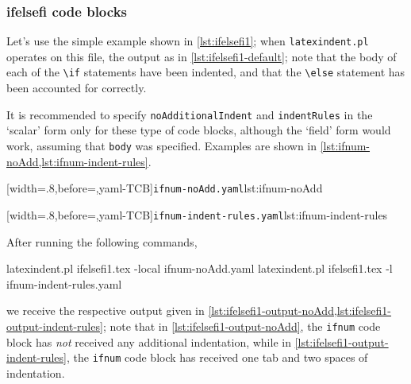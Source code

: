 \subsubsection{ifelsefi code blocks}
	Let's use the simple example shown in \cref{lst:ifelsefi1}; when \texttt{latexindent.pl}
	operates on this file, the output as in \cref{lst:ifelsefi1-default}; note that the body
	of each of the \lstinline!\if! statements have been indented, and that the
	\lstinline!\else! statement has been accounted for correctly.

	\begin{minipage}{.45\textwidth}
	\end{minipage}%
	\hfill
	\begin{minipage}{.54\textwidth}
	\end{minipage}

	It is recommended to specify \texttt{noAdditionalIndent} and \texttt{indentRules} in the
	`scalar' form only for these type of code blocks, although the `field' form would work,
	assuming that \texttt{body} was specified. Examples are shown in
	\cref{lst:ifnum-noAdd,lst:ifnum-indent-rules}.

	\begin{minipage}{.45\textwidth}
		[width=.8\linewidth,before=\centering,yaml-TCB]{\texttt{ifnum-noAdd.yaml}}{lst:ifnum-noAdd}
	\end{minipage}
	\hfill
	\begin{minipage}{.45\textwidth}
		[width=.8\linewidth,before=\centering,yaml-TCB]{\texttt{ifnum-indent-rules.yaml}}{lst:ifnum-indent-rules}
	\end{minipage}

	After running the following commands,
	\begin{commandshell}
latexindent.pl ifelsefi1.tex -local ifnum-noAdd.yaml  
latexindent.pl ifelsefi1.tex -l ifnum-indent-rules.yaml  
\end{commandshell}
	we receive the respective output given in
	\cref{lst:ifelsefi1-output-noAdd,lst:ifelsefi1-output-indent-rules}; note that in
	\cref{lst:ifelsefi1-output-noAdd}, the \texttt{ifnum} code block has \emph{not} received
	any additional indentation, while in \cref{lst:ifelsefi1-output-indent-rules}, the
	\texttt{ifnum} code block has received one tab and two spaces of indentation.

